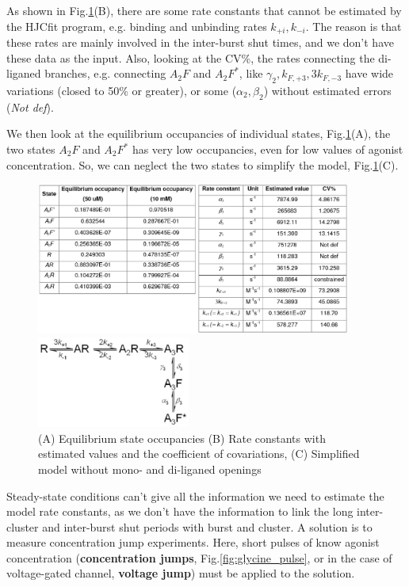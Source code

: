 As shown in Fig.\ref{fig:GlyR_estimated_param}(B), there are some rate constants
that cannot be estimated by the HJCfit program, e.g. binding and unbinding rates
$k_{+i}, k_{-i}$. The reason is that these rates are mainly involved in the
inter-burst shut times, and we don't have these data as the input. Also, looking
at the CV\%, the rates connecting the di-liganed branches, e.g. connecting
$A_2F$ and $A_2F^*$, like $\gamma_2, k_{F,+3}, 3k_{F,-3}$ have wide variations
(closed to 50\% or greater), or some ($\alpha_2, \beta_2$) without estimated
errors ({\it Not def}).

We then look at the equilibrium occupancies of individual states,
Fig.\ref{fig:GlyR_estimated_param}(A), the two states $A_2F$ and $A_2F^*$ has
very low occupancies, even for low values of agonist concentration. So, we can
neglect the two states to simplify the model,
Fig.\ref{fig:GlyR_estimated_param}(C).

\begin{figure}[hbt]
 \centerline{\includegraphics[height=5cm, angle=0]{./images/GlyR_estimated_param.eps}}
 \centerline{\includegraphics[height=3cm,
 angle=0]{./images/GlyR_model_2simplified.eps}}
 \caption{(A) Equilibrium state occupancies (B) Rate constants with estimated
values and the coefficient of covariations, (C) Simplified model without mono-
and di-liganed openings}
\label{fig:GlyR_estimated_param}
\end{figure}


Steady-state conditions can't give all the information we need to estimate the
model rate constants, as we don't have the information to link the long
inter-cluster and inter-burst shut periods with burst and cluster. A
solution is to measure concentration jump experiments. Here, short pulses of
know agonist concentration ({\bf concentration jumps},
Fig.\ref{fig:glycine_pulse}, or in the case of voltage-gated channel, {\bf
voltage jump}) must be applied to the solution.

